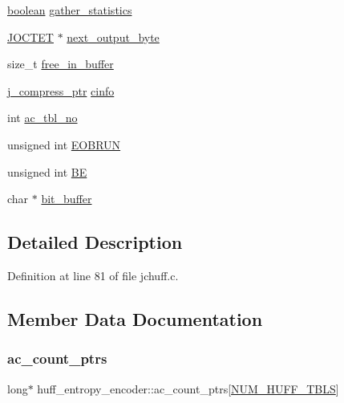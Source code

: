 \begin{DoxyCompactItemize}
\item 
\mbox{\hyperlink{jmorecfg_8h_a7c6368b321bd9acd0149b030bb8275ed}{boolean}} \mbox{\hyperlink{structhuff__entropy__encoder_ac32b3f950c2755e14bdcdbb9d5c83c82}{gather\+\_\+statistics}}
\item 
\mbox{\hyperlink{jmorecfg_8h_a356ad249f20e691b520da439f92cccbc}{J\+O\+C\+T\+ET}} $\ast$ \mbox{\hyperlink{structhuff__entropy__encoder_ad7be281727ae2a6488c8b37b017c1f40}{next\+\_\+output\+\_\+byte}}
\item 
size\+\_\+t \mbox{\hyperlink{structhuff__entropy__encoder_af8e2d1d3eb92b83376c1b6e194e54660}{free\+\_\+in\+\_\+buffer}}
\item 
\mbox{\hyperlink{jpeglib_8h_add2a072c54e3a51550f4975f7ddb91e7}{j\+\_\+compress\+\_\+ptr}} \mbox{\hyperlink{structhuff__entropy__encoder_a46ddb16b709ccae209e295480f2d38b6}{cinfo}}
\item 
int \mbox{\hyperlink{structhuff__entropy__encoder_a43f8a73e36740cd79fde6e45efef6d16}{ac\+\_\+tbl\+\_\+no}}
\item 
unsigned int \mbox{\hyperlink{structhuff__entropy__encoder_aeec45e042ccea57047e6a7dad5470f2b}{E\+O\+B\+R\+UN}}
\item 
unsigned int \mbox{\hyperlink{structhuff__entropy__encoder_a60927ee1fdfb068cb003c17587770a2b}{BE}}
\item 
char $\ast$ \mbox{\hyperlink{structhuff__entropy__encoder_adc619a5c8cb0398b78fb015c618ffdea}{bit\+\_\+buffer}}
\end{DoxyCompactItemize}


\subsection{Detailed Description}


Definition at line 81 of file jchuff.\+c.



\subsection{Member Data Documentation}
\mbox{\label{structhuff__entropy__encoder_acc141b7e17ee817d92b9340d603dde9e}} 
\subsubsection{\texorpdfstring{ac\_count\_ptrs}{ac\_count\_ptrs}}
{\footnotesize\ttfamily long$\ast$ huff\+\_\+entropy\+\_\+encoder\+::ac\+\_\+count\+\_\+ptrs\mbox{[}\mbox{\hyperlink{jpeglib_8h_a6b12985705944e0623b671f29dc5722e}{N\+U\+M\+\_\+\+H\+U\+F\+F\+\_\+\+T\+B\+LS}}\mbox{]}}



